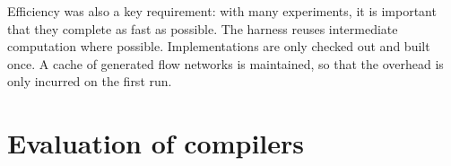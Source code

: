 Efficiency was also a key requirement: with many experiments, it is important that they complete as fast as possible. The harness reuses intermediate computation where possible. Implementations are only checked out and built once. A cache of generated flow networks is maintained, so that the overhead is only incurred on the first run.


\section{Evaluation of compilers} \label{appendix:test-compilers}

